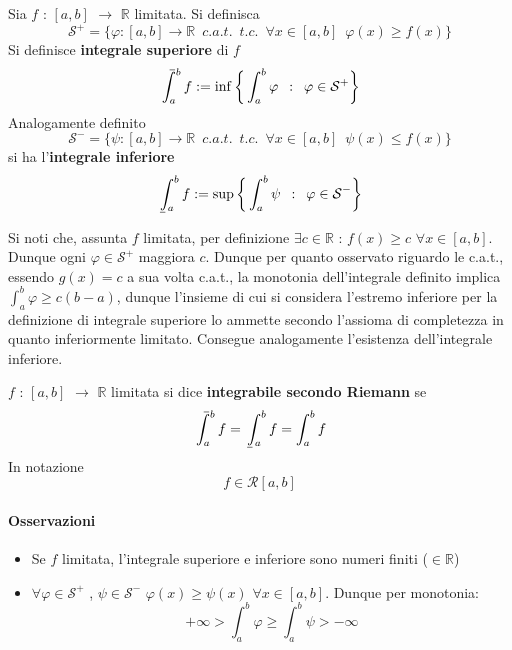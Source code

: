 \documentclass[10pt]{article}
\theoremstyle{plain}
\def\upint{\mathchoice%
    {\mkern13mu\overline{\vphantom{\intop}\mkern7mu}\mkern-20mu}%
    {\mkern7mu\overline{\vphantom{\intop}\mkern7mu}\mkern-14mu}%
    {\mkern7mu\overline{\vphantom{\intop}\mkern7mu}\mkern-14mu}%
    {\mkern7mu\overline{\vphantom{\intop}\mkern7mu}\mkern-14mu}%
  \int}
\def\lowint{\mkern3mu\underline{\vphantom{\intop}\mkern7mu}\mkern-10mu\int}
\begin{document}
\begin{defin}Sia $f$ : $[a,b]$ $\rightarrow$ $\mathbb{R}$ limitata. 
Si definisca 
\[\mathcal{S}^+ = \{\varphi : [a,b] \rightarrow \mathbb{R} \enspace c.a.t. \enspace t.c. \enspace \forall x \in [a,b] \enspace \varphi(x) \geq f(x)\}\]
Si definisce \textbf{integrale superiore} di $f$
\[\upint_a^b f := \inf\bigg\{\int_a^b \varphi \enspace : \enspace \varphi \in \mathcal{S}^+\bigg\}\]
Analogamente definito
\[\mathcal{S}^- = \{\psi : [a,b] \rightarrow \mathbb{R} \enspace c.a.t. \enspace t.c. \enspace \forall x \in [a,b] \enspace \psi(x) \leq f(x)\}\]
si ha l'\textbf{integrale inferiore}
\[\lowint_a^b f := \sup\bigg\{\int_a^b \psi \enspace : \enspace \varphi \in \mathcal{S}^-\bigg\}\]
\end{defin}

Si noti che, assunta $f$ limitata, per definizione $\exists c \in \mathbb{R}$ : $f(x) \geq c$ $\forall x \in [a,b]$. Dunque ogni $\varphi \in \mathcal{S}^+$ maggiora $c$. Dunque per quanto osservato riguardo le c.a.t., essendo $g(x) = c$ a sua volta c.a.t., la monotonia dell'integrale definito implica $\int_a^b \varphi \geq c(b-a)$, dunque l'insieme di cui si considera l'estremo inferiore per la definizione di integrale superiore lo ammette secondo l'assioma di completezza in quanto inferiormente limitato. Consegue analogamente l'esistenza dell'integrale inferiore.

\begin{defin}
    $f$ : $[a,b]$ $\rightarrow$ $\mathbb{R}$ limitata si dice \textbf{integrabile secondo Riemann} se 
    \[\upint_a^b f = \lowint_a^b f = \int_a^b f\]
    In notazione
    \[f \in \mathcal{R}[a,b]\]
\end{defin}
\paragraph*{Osservazioni}
\begin{itemize}[label = $\square$]
    \item Se $f$ limitata, l'integrale superiore e inferiore sono numeri finiti ($\in \mathbb{R}$)
    \item $\forall \varphi \in \mathcal{S}^+$ , $\psi \in \mathcal{S}^-$ $\varphi(x) \geq \psi(x)$ $\forall x \in [a,b]$. Dunque per monotonia:
    \[+\infty > \int_a^b \varphi \geq \int_a^b \psi > - \infty\]
\end{itemize}
\end{document}
